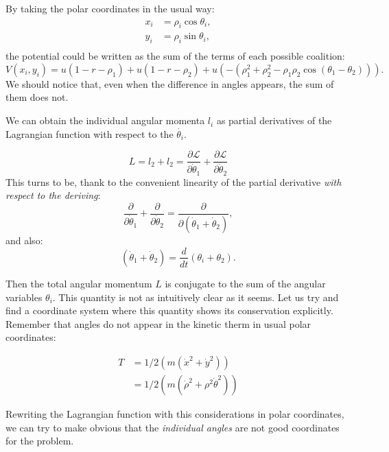 \documentclass[letterpaperr,12pt]{article}
\newcommand{\Lagr}{\mathcal{L}\xspace}
\begin{document}
By taking the polar coordinates in the usual way:
\begin{align}
x_i & = \rho_i \cos \theta_i, \\
y_i & = \rho_i \sin \theta_i, \\
\end{align}
the  potential could be written as the sum of the 
terms of each possible coalition:
\begin{equation}
V(x_i, y_i)=u(1-r-\rho_1)+u(1-r-\rho_2)
+u(-(\rho_1^2+\rho_2^2-\rho_1\rho_2\cos(\theta_1-\theta_2))).
\end{equation}
We should notice that, even when the difference in
angles appears, the sum of them does not. 

We can obtain the individual angular momenta $l_i$ as partial 
derivatives of the Lagrangian function with respect to
the $\dot{\theta_i}$. 

\begin{equation}
L=l_2+l_2=\frac{\partial \Lagr}{\partial \dot{\theta}_1}
+\frac{\partial \Lagr}{\partial \dot{\theta}_2}
\end{equation}
This turns to be, thank to the convenient linearity
of the partial derivative \emph{with respect to the deriving}:
\begin{equation}
\frac{\partial}{\partial \dot{\theta}_1}
+\frac{\partial}{\partial \dot{\theta}_2}=
\frac{\partial}{\partial(\dot{\theta}_1 +\dot{\theta}_2)},
\end{equation}
and also:
\begin{equation}
(\dot{\theta}_1 +\dot{\theta}_2)=\frac{d}{d t} (\theta_i +\theta_2).
\end{equation}

Then the total angular momentum $L$ is conjugate to the
sum of the angular variables $\theta_i$. This quantity is not as
intuitively clear as it seems. Let us try and find a coordinate
system where this quantity shows its conservation explicitly.
Remember that angles do not appear in the kinetic
therm in usual polar coordinates:

\begin{equation}
\begin{split}
T & =1/2 (m (\dot{x}^2+\dot{y}^2)) \\
 & =1/2 (m (\dot{\rho}^2+\rho^2 \dot{\theta}^2))
\end{split}
\end{equation}

Rewriting the Lagrangian function with this considerations in
polar coordinates, we can try to make obvious that
the \emph{individual angles} are not good coordinates
for the problem.
\end{document}
